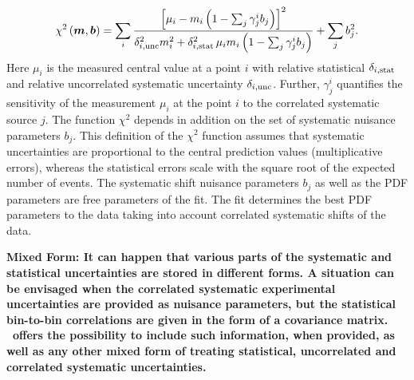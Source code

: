 \begin{description}
{ \small
\begin{equation} 
    \chi^2\left(\boldsymbol{m},\boldsymbol{b}\right) =   
 \sum_i \frac{\left[ {\mu_i} - m_i \left( 1 - \sum_j \gamma^i_j b_j \right) \right]^2}
{ \textstyle \delta^2_{i,{\rm unc}}m_i^2 + \delta^2_{i,{\rm stat}}\, {\mu_i} m_i \left(1 - \sum_j \gamma^i_j b_j\right) }
  + \sum_j b^2_j.
\label{eq:aven}
\end{equation}}
%
Here ${\mu_i}$ is the  measured central value  at a point $i$ 
with  relative statistical $\delta_{i,\rm stat}$ 
and relative uncorrelated systematic uncertainty $\delta_{i,\rm unc}$.
Further, 
$\gamma^i_j$ 
quantifies the sensitivity of the
measurement ${\mu_i}$ at the point $i$ to the correlated systematic 
source $j$. The function $\chi^2$ depends in addition on
 the set of systematic nuisance parameters $b_j$.
This definition of the $\chi^2$ function assumes that
systematic uncertainties are proportional to the central prediction values
(multiplicative errors), whereas the statistical errors scale 
with the square root of the expected number of events. 
The systematic shift nuisance parameters $b_j$ as well as the PDF 
parameters are free parameters of the fit. 
The fit determines the best PDF parameters to
the data taking into account correlated systematic shifts of the data. 
\item  \bf{Mixed Form:} \rm
It can happen that various parts of the systematic and statistical uncertainties are stored in different forms. A situation can be envisaged when the correlated systematic experimental uncertainties are provided as nuisance parameters, but the statistical bin-to-bin correlations are given in the form of a covariance matrix. \fitter\ offers the possibility to include such information, when provided, as well as any other mixed form of treating statistical, uncorrelated and correlated systematic uncertainties. 

\end{description}
